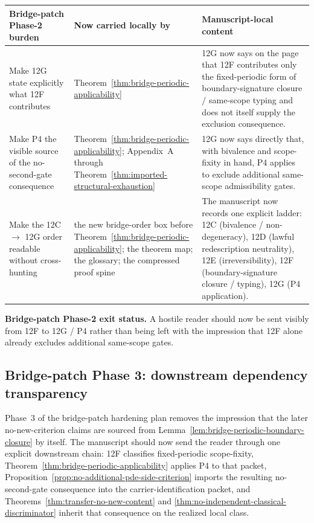 \begin{center}
\footnotesize
\renewcommand{\arraystretch}{1.16}
\setlength{\tabcolsep}{4pt}
\begin{tabularx}{0.98\textwidth}{@{}L{0.31\textwidth}L{0.24\textwidth}Y@{}}
\toprule
\textbf{Bridge-patch Phase-2 burden} & \textbf{Now carried locally by} & \textbf{Manuscript-local content}\\
\midrule
Make 12G state explicitly what 12F contributes & Theorem~\ref{thm:bridge-periodic-applicability} & 12G now says on the page that 12F contributes only the fixed-periodic form of boundary-signature closure / same-scope typing and does not itself supply the exclusion consequence.\\
Make P4 the visible source of the no-second-gate consequence & Theorem~\ref{thm:bridge-periodic-applicability}; Appendix~A through Theorem~\ref{thm:imported-structural-exhaustion} & 12G now says directly that, with bivalence and scope-fixity in hand, P4 applies to exclude additional same-scope admissibility gates.\\
Make the 12C $\to$ 12G order readable without cross-hunting & the new bridge-order box before Theorem~\ref{thm:bridge-periodic-applicability}; the theorem map; the glossary; the compressed proof spine & The manuscript now records one explicit ladder: 12C (bivalence / non-degeneracy), 12D (lawful redescription neutrality), 12E (irreversibility), 12F (boundary-signature closure / typing), 12G (P4 application).\\
\bottomrule
\end{tabularx}
\end{center}

\noindent\textbf{Bridge-patch Phase-2 exit status.} A hostile reader should now be sent visibly from 12F to 12G / P4 rather than being left with the impression that 12F alone already excludes additional same-scope gates.

\subsection*{Bridge-patch Phase 3: downstream dependency transparency}
Phase~3 of the bridge-patch hardening plan removes the impression that the later no-new-criterion claims are sourced from Lemma~\ref{lem:bridge-periodic-boundary-closure} by itself. The manuscript should now send the reader through one explicit downstream chain: 12F classifies fixed-periodic scope-fixity, Theorem~\ref{thm:bridge-periodic-applicability} applies P4 to that packet, Proposition~\ref{prop:no-additional-pde-side-criterion} imports the resulting no-second-gate consequence into the carrier-identification packet, and Theorems~\ref{thm:transfer-no-new-content} and \ref{thm:no-independent-classical-discriminator} inherit that consequence on the realized local class.

